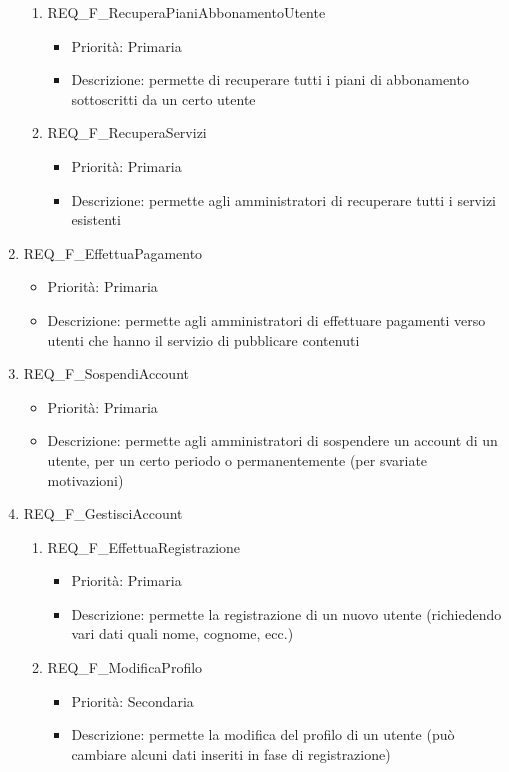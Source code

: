 \begin{enumerate}
\begin{enumerate}[label*=\arabic*.]
		\item REQ\_F\_RecuperaPianiAbbonamentoUtente
			\begin{itemize}	
			\item Priorità: Primaria
			\item Descrizione: permette di recuperare tutti i piani di abbonamento sottoscritti da un certo utente
			\end{itemize}

		\item REQ\_F\_RecuperaServizi
			\begin{itemize}	
			\item Priorità: Primaria
			\item Descrizione: permette agli amministratori di recuperare tutti i servizi esistenti
			\end{itemize}
		\end{enumerate}

	\item REQ\_F\_EffettuaPagamento
		\begin{itemize}	
		\item Priorità: Primaria
		\item Descrizione: permette agli amministratori di effettuare pagamenti verso utenti che hanno il servizio di pubblicare contenuti
		\end{itemize}
	\item REQ\_F\_SospendiAccount
		\begin{itemize}	
		\item Priorità: Primaria
		\item Descrizione: permette agli amministratori di sospendere un account di un utente, per un certo periodo o permanentemente  (per svariate motivazioni)	
		\end{itemize}

	
	\item REQ\_F\_GestisciAccount
		\begin{enumerate}[label*=\arabic*.]
		\item REQ\_F\_EffettuaRegistrazione	
			\begin{itemize}	
			\item Priorità: Primaria
			\item Descrizione: permette la registrazione di un nuovo utente (richiedendo vari dati quali nome, cognome, ecc.)
			\end{itemize}
		\item REQ\_F\_ModificaProfilo
			\begin{itemize}	
			\item Priorità: Secondaria
			\item Descrizione: permette la modifica del profilo di un utente (può cambiare alcuni dati inseriti in fase di registrazione)
			\end{itemize}


\end{enumerate}
\end{enumerate}
